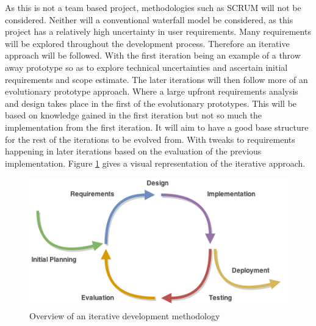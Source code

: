 \documentclass[11pt,oneside]{report}
\begin{document}
					As this is not a team based project, methodologies such as SCRUM will not be considered.
					Neither will a conventional waterfall model be considered, as this project has a relatively high uncertainty in user requirements.
					Many requirements will be explored throughout the development process.
					Therefore an iterative approach will be followed.
					With the first iteration being an example of a throw away prototype so as to explore technical uncertainties and ascertain initial requirements and scope estimate.
					The later iterations will then follow more of an evolutionary prototype approach.
					Where a large upfront requirements analysis and design takes place in the first of the evolutionary prototypes.
					This will be based on knowledge gained in the first iteration but not so much the implementation from the first iteration.
					It will aim to have a good base structure for the rest of the iterations to be evolved from.
					With tweaks to requirements happening in later iterations based on the evaluation of the previous implementation.
					Figure \ref{fig:iterative} gives a visual representation of the iterative approach.
					\begin{figure}[!h]
						\begin{center}
					
    						\includegraphics[scale=0.5]{iterative_development}
    						\caption{Overview of an iterative development methodology {\label{fig:iterative}}}
    					\end{center}
					\end{figure}
\end{document}

